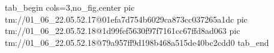 
 
 
 
 

\qqSecCmtScr


\ifcmt
  tab_begin cols=3,no_fig,center
    pic tm://01_06_22.05.52.17@01efa7d754b6029ca873cc037265a1dc
    pic tm://01_06_22.05.52.18@1d99fef5630f97f7161cc67ffd8ad063
    pic tm://01_06_22.05.52.18@79a957ff9d198b468a515de40bc2cdd0
  tab_end
\fi

